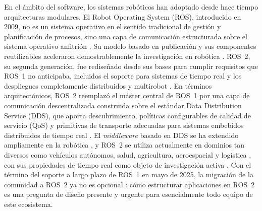 En el ámbito del software, los sistemas robóticos han adoptado desde hace
tiempo arquitecturas modulares. El Robot Operating System (ROS), introducido
en 2009, no es un sistema operativo en el sentido tradicional de gestión y
planificación de procesos, sino una capa de comunicación estructurada sobre
el sistema operativo anfitrión \cite{quigley2009}. Su modelo basado en
publicación y sus componentes reutilizables aceleraron demostrablemente la
investigación en robótica \cite{macenski2022}. ROS~2, su segunda generación,
fue rediseñado desde sus bases para cumplir requisitos que ROS~1 no
anticipaba, incluidos el soporte para sistemas de tiempo real y los
despliegues completamente distribuidos y multirobot \cite{macenski2022,
portugal2025}. En términos arquitectónicos, ROS~2 reemplazó el máster
central de ROS~1 por una capa de comunicación descentralizada construida
sobre el estándar Data Distribution Service (DDS), que aporta descubrimiento,
políticas configurables de calidad de servicio (QoS) y primitivas de
transporte adecuadas para sistemas embebidos distribuidos de tiempo real
\cite{macenski2022, maruyama2016, gambo2025}. El \emph{middleware} basado en
DDS se ha extendido ampliamente en la robótica \cite{gambo2025}, y ROS~2 se
utiliza actualmente en dominios tan diversos como vehículos autónomos,
salud, agricultura, aeroespacial y logística \cite{al-batati2026}, con sus
propiedades de tiempo real como objeto de investigación activa
\cite{casini2026}. Con el término del soporte a largo plazo de ROS~1 en mayo
de 2025, la migración de la comunidad a ROS~2 ya no es opcional
\cite{portugal2025}: cómo estructurar aplicaciones en ROS~2 es una pregunta
de diseño presente y urgente para esencialmente todo equipo de este
ecosistema.


